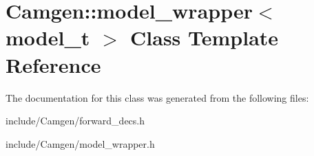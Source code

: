 \hypertarget{a00371}{\section{Camgen\-:\-:model\-\_\-wrapper$<$ model\-\_\-t $>$ Class Template Reference}
\label{a00371}
}


The documentation for this class was generated from the following files\-:\begin{DoxyCompactItemize}
\item 
include/\-Camgen/forward\-\_\-decs.\-h\item 
include/\-Camgen/model\-\_\-wrapper.\-h\end{DoxyCompactItemize}
